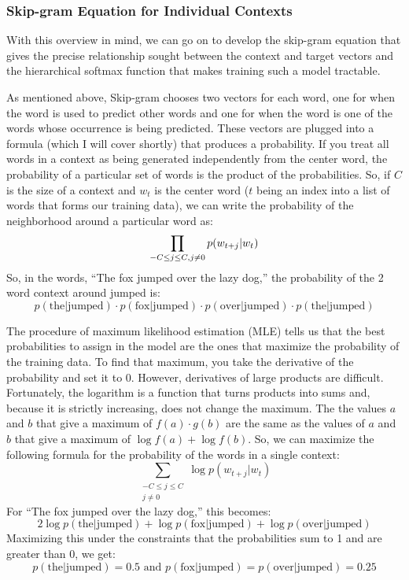 \subsubsection{Skip-gram Equation for Individual Contexts}

With this overview in mind, we can go on to develop the skip-gram equation that
gives the precise relationship sought between the context and target vectors
and the hierarchical softmax function that makes training such a model 
tractable.

As mentioned above, Skip-gram chooses two vectors for each word, one for when 
the word is used to predict other words and one for when the word is one of the 
words whose occurrence is being predicted. These vectors are plugged into a 
formula (which I will cover shortly) that produces a probability. If you treat 
all words in a context as being generated independently from the center word, 
the probability of a particular set of words is the product of the 
probabilities. So, if $C$ is the size of a context and $w_t$ is the center word 
($t$ being an index into a list of words that forms our training data), we can 
write the probability of the neighborhood around a particular word as:
%
\[\prod_{-C \le j \le C, \\ j \ne 0 } p(w_{t+j}|w_t)\]
%
So, in the words, ``The fox jumped over the lazy dog,'' the 
probability of the 2 word context around jumped is:
%
\[p(\text{the|jumped})\cdot{}p(\text{fox|jumped})\cdot{}p(\text{over|jumped})\cdot{}p(\text{the|jumped})\]

The procedure of maximum likelihood estimation (MLE) tells us that the best
probabilities to assign in the model are the ones that maximize the probability
of the training data. To find that maximum, you take the derivative of the
probability and set it to 0. However, derivatives of large products are 
difficult. Fortunately, the logarithm is a function that turns products into
sums and, because it is strictly increasing, does not change the maximum. The
the values $a$ and $b$ that give a maximum of $f(a)\cdot{}g(b)$ are the same as 
the values of $a$ and $b$ that give a maximum of
$\log{f(a)} + \log{f(b)}$. So, we can maximize the following formula for the
probability of the words in a single context:
%
\[\sum_{\substack{-C \le j \le C \\ j \ne 0 }} \log{p(w_{t+j}|w_t)}\]
%
For ``The fox jumped over the lazy dog,'' this becomes:
%
\[2\log{p(\text{the|jumped})}+\log{p(\text{fox|jumped})}+\log{p(\text{over|jumped})}\]
%
Maximizing this under the constraints that the probabilities sum to 1 and are
greater than 0, we get:
\[p(\text{the|jumped})=0.5 \text{ and } p(\text{fox|jumped})=p(\text{over|jumped})=0.25\]

